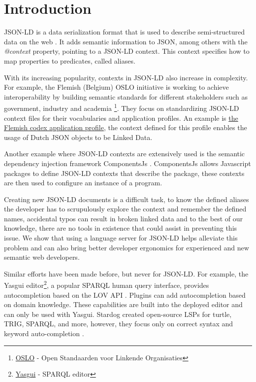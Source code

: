 \documentclass[
]{ceurart}
\begin{document}
\maketitle

\section{Introduction}

JSON-LD is a data serialization format that is used to describe semi-structured data on the web \cite{JSON-LD-W3C}.
It adds semantic information to JSON, among others with the \textit{@context} property, pointing to a JSON-LD context.
This context specifies how to map properties to predicates, called aliases.

With its increasing popularity, contexts in JSON-LD also increase in complexity.
For example, the Flemish (Belgium) OSLO initiative is working to achieve interoperability by building semantic standards for different stakeholders such as government, industry and academia \footnote{\href{https://www.vlaanderen.be/digitaal-vlaanderen/onze-oplossingen/oslo}{OSLO} - Open Standaarden voor Linkende Organisaties}.
They focus on standardizing JSON-LD context files for their vocabularies and application profiles. 
An example is \href{https://data.vlaanderen.be/doc/applicatieprofiel/vlaamse-codex/}{the Flemish codex application profile}, the context defined for this profile enables the usage of Dutch JSON objects to be Linked Data.

Another example where JSON-LD contexts are extensively used is the semantic dependency injection framework ComponentsJs \cite{CJS}. 
ComponentsJs allows Javascript packages to define JSON-LD contexts that describe the package, these contexts are then used to configure an instance of a program.

Creating new JSON-LD documents is a difficult task, to know the defined aliases the developer has to scrupulously explore the context and remember the defined names, 
accidental typos can result in broken linked data and to the best of our knowledge, there are no tools in existence that could assist in preventing this issue.
We show that using a language server for JSON-LD helps alleviate this problem and can also bring better developer ergonomics for experienced and new semantic web developers.

Similar efforts have been made before, but never for JSON-LD. 
For example, the Yasgui editor\footnote{\href{https://triply.cc/docs/yasgui/}{Yasgui} - SPARQL editor}, a popular SPARQL human query interface, provides autocompletion based on the LOV API \cite{LOV}. 
Plugins can add autocompletion based on domain knowledge. 
These capabilities are built into the deployed editor and can only be used with Yasgui.
Stardog created open-source LSPs for turtle, TRIG, SPARQL, and more, however, they focus only on correct syntax and keyword auto-completion \cite{stardog}. 
\end{document}
